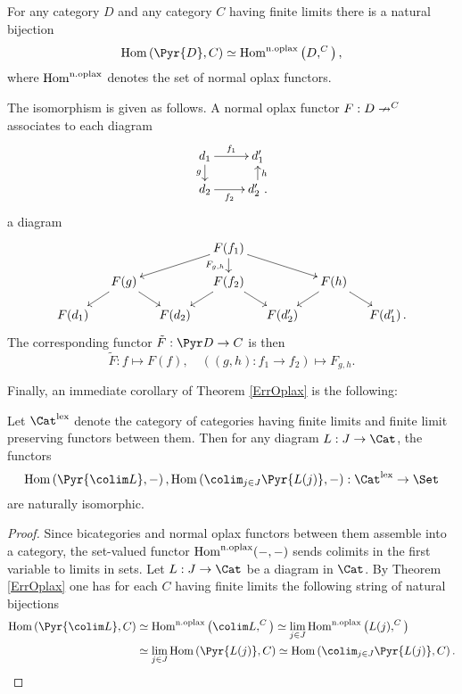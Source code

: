 \documentclass[a4paper]{article}
\numberwithin{equation}{section}
\begin{document}
\begin{thm}
\label{ErrOplax}
 For any category $D$ and any category $C$ having finite limits there is a natural bijection
 \begin{equation*}
  \mathrm{Hom}\left(\Pyr{D},C\right) \simeq \mathrm{Hom}^{\rm n.oplax} \left(D, \sp C \right),
 \end{equation*}
 where $\mathrm{Hom}^{\rm n.oplax}$ denotes the set of normal oplax functors.
\end{thm}
The isomorphism is given as follows. A normal oplax functor $F:D \nrightarrow \sp C$ associates to each diagram 
\begin{equation*}
 \xymatrixrowsep{.9pc} \xymatrix{d_1 \ar[r]^-{f_1} \ar[d]_-g & d_1' \\
 d_2 \ar[r]_-{f_2} & d_2'\ .\ar[u]_-h }
\end{equation*}
a diagram
\begin{equation*}
 \xymatrixrowsep{.9pc} \xymatrixcolsep{1pc} \xymatrix{ & & & F(f_1) \ar[rrd] \ar[d]_-{F_{g,h}} \ar[lld] & & & \\
  & F(g) \ar[ld] \ar[rd] & & F(f_2) \ar[ld] \ar[rd] & & F(h) \ar[ld] \ar[rd] & \\
  F(d_1) & & F(d_2) & & F(d_2') & & F(d_1')\, .}
\end{equation*}
The corresponding functor $\tilde{F}: \Pyr D \to C$ is then
\begin{equation*}
 \tilde{F}: f \mapsto F(f), \quad \left((g,h):f_1 \to f_2\right) \mapsto F_{g,h}.
\end{equation*}

Finally, an immediate corollary of Theorem \ref{ErrOplax} is the following:
\begin{cor}
 \label{Twistedcolim}
 Let $\Cat^\mathrm{lex}$ denote the category of categories having finite limits and finite limit preserving functors between them. Then for any diagram $L:J \to \Cat$, the functors
 \begin{equation*}
  \mathrm{Hom}\left( \Pyr{\colim L}, - \right), \mathrm{Hom}\left( \colim_{j \in J} \Pyr{L(j)}, -\right):\Cat^\mathrm{lex} \to \Set
 \end{equation*}
are naturally isomorphic.
\end{cor}
\begin{proof}
 Since bicategories and normal oplax functors between them assemble into a category, the set-valued functor $\mathrm{Hom}^{\rm n.oplax}(-,-)$ sends colimits in the first variable to limits in sets. Let $L:J \to \Cat$ be a diagram in $\Cat$. By Theorem \ref{ErrOplax} one has for each $C$ having finite limits the following string of natural bijections
 \begin{align*}
  \mathrm{Hom}\left(\Pyr{\colim L}, C \right) &\simeq \mathrm{Hom}^{\rm n.oplax} \left(\colim L , \sp C \right) \simeq \lim_{j \in J} \mathrm{Hom}^{\rm n.oplax}\left(L(j), \sp C \right) \\
  &\simeq \lim_{j \in J} \mathrm{Hom} \left( \Pyr{L(j)}, C \right) \simeq \mathrm{Hom} \left( \colim_{j \in J} \Pyr{L(j)}, C\right).
 \end{align*}

\end{proof}
\end{document}
